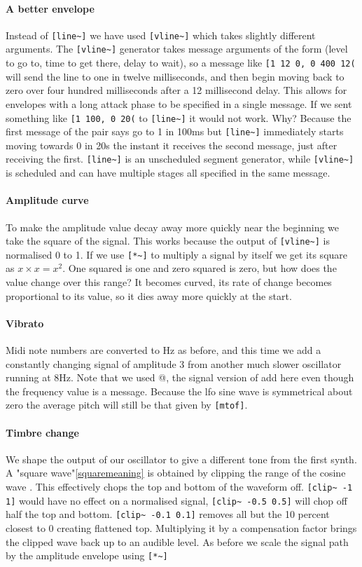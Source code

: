 \paragraph{A better envelope}
Instead of \verb+[line~]+ we have used \verb+[vline~]+ 
which takes slightly different arguments. The \verb+[vline~]+  generator
takes message arguments of the form (level to go to, time to get
there, delay to wait), so a message like \verb+[1 12 0, 0 400 12(+ will send
the line to one in twelve milliseconds, and then begin moving back to
zero over four hundred milliseconds after a 12 millisecond delay.
This allows for envelopes with a long attack phase to be specified in
a single message. If we sent something like \verb+[1 100, 0 20(+ to 
\verb+[line~]+ it would not work. Why? Because the first message of
the pair says go to 1 in 100ms but \verb+[line~]+ immediately
starts moving towards 0 in 20s the instant it receives the second message,
just after receiving the first. \verb+[line~]+ is an unscheduled
segment generator, while \verb+[vline~]+ is scheduled and can have
multiple stages all specified in the same message.
 
\paragraph{Amplitude curve}
To make the amplitude value decay away more quickly near the beginning we take
the square of the signal. This works because the output of \verb+[vline~]+
is normalised 0 to 1. If we use \verb+[*~]+ to multiply a signal by
itself  we get its square as ${x \times x = x^2}$. One squared is
one and zero squared is zero, but how does the value change over this range?
It becomes curved, its rate of change becomes proportional to its value, so
it dies away more quickly at the start. 

\paragraph{Vibrato}
Midi note numbers are converted to Hz as before, and this time we add
a constantly changing signal of amplitude 3 from another much slower
oscillator running at 8Hz. Note that we used \verb@[+~]@, the signal
version of add here even though the frequency value is a message.
Because the lfo sine wave is symmetrical about zero the average pitch
will still be that given by \verb+[mtof]+.

\paragraph{Timbre change}
We shape the output of our oscillator to give a different
tone from the first synth. A "square wave"\dag \ref{squaremeaning} is obtained by
clipping the range of the cosine wave . This effectively
chops the top and bottom of the waveform off. \verb+[clip~ -1 1]+
would have no effect on a normalised signal, \verb+[clip~ -0.5 0.5]+
will chop off half the top and bottom. \verb+[clip~ -0.1 0.1]+
removes all but the 10 percent closest to 0 creating flattened
top. Multiplying it by a compensation factor brings the clipped wave back up to an audible level. As before
we scale the signal path by the amplitude envelope using \verb+[*~]+

